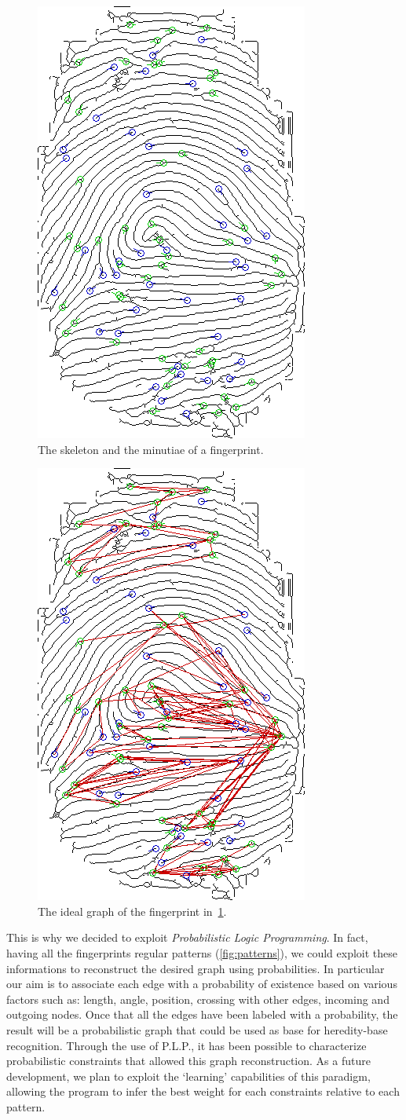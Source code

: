 \documentclass[8pt]{article}
\begin{document}
   	\begin{figure}
    	\centering
    	\includegraphics[width=0.35\linewidth]{img/ske_min}
    	\caption{The skeleton and the minutiae of a fingerprint.}
    	\label{fig:ske_min}
    \end{figure}
    
    \begin{figure}
    	\centering
    	\includegraphics[width=0.35\linewidth]{img/ske_min_graph}
    	\caption{The ideal graph of the fingerprint in~\cref{fig:ske_min}.}
    	\label{fig:ske_min_graph}
    \end{figure}%
    
    This is why we decided to exploit \textit{Probabilistic Logic Programming}.
   	In fact, having all the fingerprints regular patterns
    (\cref{fig:patterns}), we could exploit these informations to reconstruct 
    the desired graph using probabilities.
   	In particular our aim is to associate each edge with a probability of existence 
    based on various factors such as: length, angle, position, crossing with other edges, 
    incoming and outgoing nodes.
   	Once that all the edges have been labeled with a probability, the result will be a 
    probabilistic graph that could be used as base for heredity-base recognition.
   	Through the use of P.L.P., it has been possible to characterize probabilistic 
    constraints that allowed this graph reconstruction.
   	As a future development, we plan to exploit the \textquoteleft learning' capabilities of 
    this paradigm, allowing the program to infer the best weight for each constraints 
    relative to each pattern.
\end{document}

